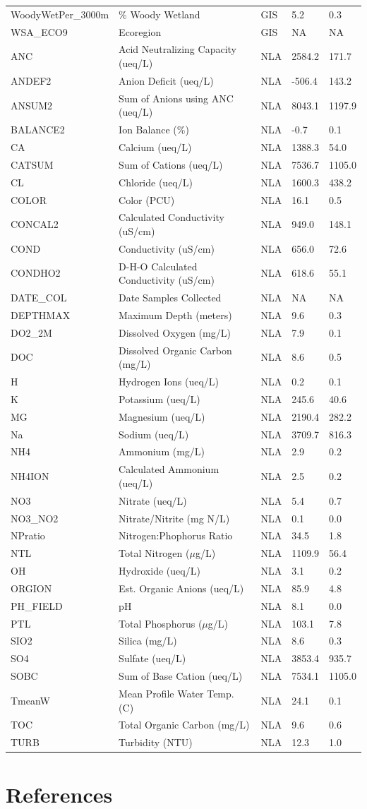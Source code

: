 \documentclass[12pt,]{article}
\begin{document}
\begin{longtable}[c]{@{}lllll@{}}
WoodyWetPer\_3000m & \% Woody Wetland & GIS & 5.2 & 0.3\tabularnewline
WSA\_ECO9 & Ecoregion & GIS & NA & NA\tabularnewline
ANC & Acid Neutralizing Capacity (ueq/L) & NLA & 2584.2 &
171.7\tabularnewline
ANDEF2 & Anion Deficit (ueq/L) & NLA & -506.4 & 143.2\tabularnewline
ANSUM2 & Sum of Anions using ANC (ueq/L) & NLA & 8043.1 &
1197.9\tabularnewline
BALANCE2 & Ion Balance (\%) & NLA & -0.7 & 0.1\tabularnewline
CA & Calcium (ueq/L) & NLA & 1388.3 & 54.0\tabularnewline
CATSUM & Sum of Cations (ueq/L) & NLA & 7536.7 & 1105.0\tabularnewline
CL & Chloride (ueq/L) & NLA & 1600.3 & 438.2\tabularnewline
COLOR & Color (PCU) & NLA & 16.1 & 0.5\tabularnewline
CONCAL2 & Calculated Conductivity (uS/cm) & NLA & 949.0 &
148.1\tabularnewline
COND & Conductivity (uS/cm) & NLA & 656.0 & 72.6\tabularnewline
CONDHO2 & D-H-O Calculated Conductivity (uS/cm) & NLA & 618.6 &
55.1\tabularnewline
DATE\_COL & Date Samples Collected & NLA & NA & NA\tabularnewline
DEPTHMAX & Maximum Depth (meters) & NLA & 9.6 & 0.3\tabularnewline
DO2\_2M & Dissolved Oxygen (mg/L) & NLA & 7.9 & 0.1\tabularnewline
DOC & Dissolved Organic Carbon (mg/L) & NLA & 8.6 & 0.5\tabularnewline
H & Hydrogen Ions (ueq/L) & NLA & 0.2 & 0.1\tabularnewline
K & Potassium (ueq/L) & NLA & 245.6 & 40.6\tabularnewline
MG & Magnesium (ueq/L) & NLA & 2190.4 & 282.2\tabularnewline
Na & Sodium (ueq/L) & NLA & 3709.7 & 816.3\tabularnewline
NH4 & Ammonium (mg/L) & NLA & 2.9 & 0.2\tabularnewline
NH4ION & Calculated Ammonium (ueq/L) & NLA & 2.5 & 0.2\tabularnewline
NO3 & Nitrate (ueq/L) & NLA & 5.4 & 0.7\tabularnewline
NO3\_NO2 & Nitrate/Nitrite (mg N/L) & NLA & 0.1 & 0.0\tabularnewline
NPratio & Nitrogen:Phophorus Ratio & NLA & 34.5 & 1.8\tabularnewline
NTL & Total Nitrogen (\(\mu\)g/L) & NLA & 1109.9 & 56.4\tabularnewline
OH & Hydroxide (ueq/L) & NLA & 3.1 & 0.2\tabularnewline
ORGION & Est. Organic Anions (ueq/L) & NLA & 85.9 & 4.8\tabularnewline
PH\_FIELD & pH & NLA & 8.1 & 0.0\tabularnewline
PTL & Total Phosphorus (\(\mu\)g/L) & NLA & 103.1 & 7.8\tabularnewline
SIO2 & Silica (mg/L) & NLA & 8.6 & 0.3\tabularnewline
SO4 & Sulfate (ueq/L) & NLA & 3853.4 & 935.7\tabularnewline
SOBC & Sum of Base Cation (ueq/L) & NLA & 7534.1 & 1105.0\tabularnewline
TmeanW & Mean Profile Water Temp. (C) & NLA & 24.1 & 0.1\tabularnewline
TOC & Total Organic Carbon (mg/L) & NLA & 9.6 & 0.6\tabularnewline
TURB & Turbidity (NTU) & NLA & 12.3 & 1.0\tabularnewline
\bottomrule
\end{longtable}

\newpage

\section*{References}\label{references}
\end{document}
